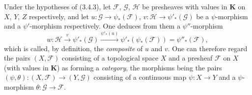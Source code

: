 \begin{env}[3.5.2]
\label{0.3.5.2}
Under the hypotheses of (3.4.3), let $\mathcal{F}$, $\mathcal{G}$,
$\mathcal{H}$ be presheaves with values in $\boldsymbol{K}$ on $X$, $Y$, $Z$
respectively, and let
$u:\mathcal{G}\to\psi_*(\mathcal{F})$,
$v:\mathcal{H}\to\psi'_*(\mathcal{G})$ be a $\psi$-morphism and a
$\psi'$-morphism respectively. One deduces from them a $\psi''$-morphism
\[
  w:\mathcal{H}\xrightarrow{v}\psi'_*(\mathcal{G})
  \xrightarrow{\psi'_*(u)}
  \psi'_*(\psi_*(\mathcal{F}))=\psi''_*(\mathcal{F}),
\]
which is called, by definition, the \emph{composite} of $u$ and $v$. One can
therefore regard the pairs $(X,\mathcal{F})$ consisting of a topological space
$X$ and a presheaf $\mathcal{F}$ on $X$ (with values in $\boldsymbol{K}$)
as forming a \emph{category}, the morphisms being the pairs
$(\psi,\theta):(X,\mathcal{F})\to(Y,\mathcal{G})$ consisting of a continuous
map $\psi:X\to Y$ and a $\psi$-morphism
$\theta:\mathcal{G}\to\mathcal{F}$.
\end{env}

